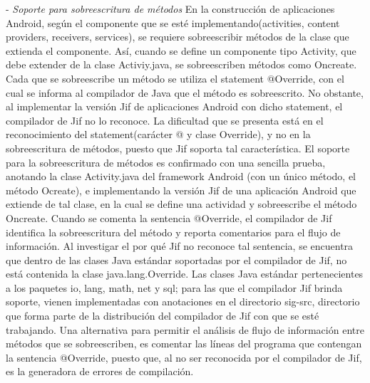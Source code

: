 - \textit{Soporte para sobreescritura de métodos}\newline 
En la construcción de aplicaciones Android, según el componente que se esté
implementando(activities, content providers, receivers, services), se requiere
sobreescribir métodos de la clase que extienda el componente. Así, cuando se
define un componente tipo Activity, que debe extender de la clase Activiy.java, 
se sobreescriben métodos como Oncreate. Cada que se sobreescribe
un método se utiliza el statement @Override, con el cual se informa al
compilador de Java que el método es sobreescrito. No obstante, al implementar la
versión Jif de aplicaciones Android con dicho statement, el compilador de Jif
no lo reconoce. La dificultad que se presenta está en el reconocimiento del
statement(carácter @ y clase Override), y no en la sobreescritura de métodos,
puesto que Jif soporta tal característica. El soporte para la sobreescritura de
métodos es confirmado con una sencilla prueba, anotando la clase Activity.java
del framework Android (con un único método, el método Ocreate), e implementando
la versión Jif de una aplicación Android que extiende de tal clase, en la cual
se define una actividad y sobreescribe el método Oncreate.
Cuando se comenta la sentencia @Override, el compilador de Jif identifica la
sobreescritura del método y reporta comentarios para el flujo de información.\newline 
Al investigar el por qué Jif no reconoce tal sentencia, se encuentra que dentro
de las clases Java estándar soportadas por el compilador de Jif, no está
contenida la clase java.lang.Override.\newline
Las clases Java estándar pertenecientes a los paquetes io, lang, math, net y
sql; para las que el compilador Jif brinda soporte, vienen implementadas con
anotaciones en el directorio sig-src, directorio que forma parte de la
distribución del compilador de Jif con que se esté trabajando.\newline
Una alternativa para permitir el análisis de flujo de información entre métodos
que se sobreescriben, es comentar las líneas del programa que contengan la
sentencia @Override, puesto que, al no ser reconocida por el compilador de Jif,
es la generadora de errores de compilación.


